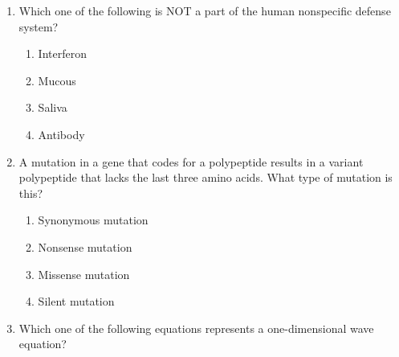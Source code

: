 \documentclass[12pt]{article}
\begin{document}
\begin{enumerate}[label=Q.\arabic*]
		P. Conjugation \\
		Q. Transformation \\
		R. Transduction \\
		S. Transfection

		\begin{multicols}{2}
			\begin{enumerate}[label=(\Alph*)]
				\item P only 
				\item P and Q only 
				\item P, Q and R only 
				\item P, Q, R and S
			\end{enumerate}
		\end{multicols}

	\item Which one of the following is NOT a part of the human nonspecific defense system?
		\begin{multicols}{4}
			\begin{enumerate}[label=(\Alph*)]
				\item Interferon
				\item Mucous
				\item Saliva
				\item Antibody
			\end{enumerate}
		\end{multicols}

	\item A mutation in a gene that codes for a polypeptide results in a variant polypeptide that lacks the last three amino acids. What type of mutation is this?
		\begin{multicols}{2}
			\begin{enumerate}[label=(\Alph*)]
				\item Synonymous mutation 
				\item Nonsense mutation 
				\item Missense mutation 
				\item Silent mutation
			\end{enumerate}
		\end{multicols}

	\item Which one of the following equations represents a one-dimensional wave equation?


\end{enumerate}
\end{document}
